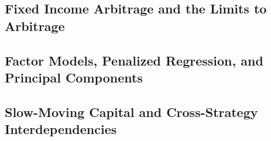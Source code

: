 
\subsection{Fixed Income Arbitrage and the Limits to Arbitrage}
\label{sec:lit_arb}
%
%
%
%
%

\subsection{Factor Models, Penalized Regression, and Principal Components}
\label{sec:lit_methods}
%
%
%

\subsection{Slow-Moving Capital and Cross-Strategy Interdependencies}
\label{sec:lit_slowcap}
%
